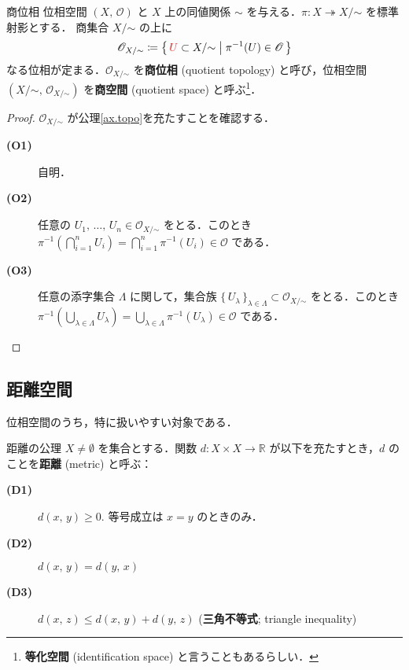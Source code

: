 \documentclass[geometry_main]{subfiles}
\begin{document}
\begin{mydef}[label=def.quotopo]{商位相}
	位相空間 $(X,\, \mathscr{O})$ と $X$ 上の同値関係 $\sim$ を与える．$\pi \colon X \twoheadrightarrow X/\mathord{\sim}$ を標準射影とする．
	商集合 $X/\mathord{\sim}$ の上に
	\begin{align}
		\mathscr{O}_{X/\mathord{\sim}} \coloneqq \bigl\{\, \textcolor{red}{U} \subset X/\mathord{\sim} \bigm| \pi^{-1}(U) \in \mathscr{O} \,\bigr\}
	\end{align}
	なる位相が定まる．$\mathscr{O}_{X/\mathord{\sim}}$ を\textbf{商位相} (quotient topology) と呼び，位相空間 $(X/\mathord{\sim},\, \mathscr{O}_{X/\mathord{\sim}})$ を\textbf{商空間} (quotient space) と呼ぶ\footnote{\textbf{等化空間} (identification space) と言うこともあるらしい．}．
\end{mydef}
\begin{proof}
	$\mathscr{O}_{X/\mathord{\sim}}$ が公理\ref{ax.topo}を充たすことを確認する．
	\begin{description}
		\item[\textbf{(O1)}] 自明．
		\item[\textbf{(O2)}] 任意の $U_1,\, \dots ,\, U_n \in \mathscr{O}_{X/\mathord{\sim}}$ をとる．このとき $\pi^{-1}\left(\bigcap_{i=1}^n U_i\right) = \bigcap_{i=1}^n \pi^{-1}(U_i) \in \mathscr{O}$ である．
		\item[\textbf{(O3)}] 任意の添字集合 $\Lambda$ に関して，集合族 $\bigl\{\, U_\lambda \,\bigr\}_{\lambda \in \Lambda} \subset \mathscr{O}_{X/\mathord{\sim}}$ をとる．このとき $\pi^{-1} \left( \bigcup_{\lambda \in \Lambda} U_\lambda \right) = \bigcup_{\lambda \in \Lambda} \pi^{-1} (U_\lambda) \in \mathscr{O}$ である．
	\end{description}
\end{proof}

\subsection{距離空間}

位相空間のうち，特に扱いやすい対象である．

\begin{myaxiom}[label=ax.metric]{距離の公理}
	$X \neq \emptyset$ を集合とする．関数 $d \colon X\times X \to \mathbb{R}$ が以下を充たすとき，$d$ のことを\textbf{距離} (metric) と呼ぶ：
	\begin{description}
		\item[\textbf{(D1)}] $d(x, \, y) \ge 0.$ 等号成立は $x = y$ のときのみ．
		\item[\textbf{(D2)}] $d(x,\, y) = d(y,\, x)$
		\item[\textbf{(D3)}] $d(x,\, z) \le d(x,\, y) + d(y,\, z)$  (\textbf{三角不等式}; triangle inequality)
	\end{description} 
\end{myaxiom}
\end{document}
